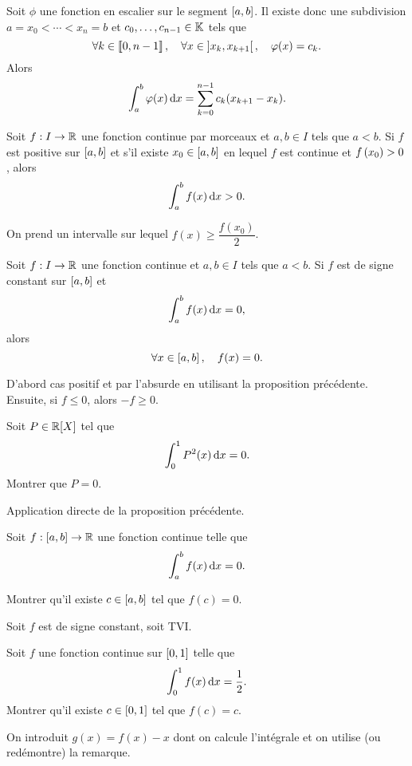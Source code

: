 \documentclass{magnolia}
\begin{document}
\begin{remarqueUnique}
\remarque[utile=-3] Soit $\phi$ une fonction en escalier sur le segment $\left[a,b\right]$. Il existe donc une subdivision $a=x_0<\cdots<x_n=b$ et $c_0,\ldots,c_{n-1}\in\mathbb{K}$ tels que
\[\forall k\in\left\llbracket 0,n-1\right\rrbracket,\quad \forall x\in\left]x_k,x_{k+1}\right[ ,\quad \varphi(x)=c_k.\]
Alors
\[\int_{a}^{b} \varphi(x)\,\text{d}x=\sum_{k=0}^{n-1} c_k(x_{k+1}-x_k).\]
\end{remarqueUnique}


\begin{proposition}[utile=2]
Soit $f:I\to\mathbb{R}$ une fonction continue par morceaux et $a, b\in I$ tels que $a< b$. Si $f$ est positive sur $\left[a,b\right]$ et s'il existe
$x_0\in\left[a,b\right]$ en lequel $f$ est continue et $f\left(x_0\right)>0$, alors
\[\int_{a}^{b} f(x)\,\text{d}x>0.\]
\end{proposition}

\begin{preuve}
On prend un intervalle sur lequel $f(x)\geq \dfrac{f(x_0)}{2}$.
\end{preuve}


\begin{proposition}[utile=2]
Soit $f:I\to\mathbb{R}$ une fonction continue et $a,b\in I$ tels que $a< b$. Si $f$ est de
signe constant sur $\left[a,b\right]$ et
\[\int_{a}^{b} f(x)\,\text{d}x=0,\]
alors
\[\forall x\in\left[a,b\right] ,\quad f(x)=0.\]
\end{proposition}

\begin{preuve}
D'abord cas positif et par l'absurde en utilisant la proposition précédente. Ensuite, si $f\leq 0$, alors $-f\geq 0$.
\end{preuve}

\begin{exos}
\exo[utile=3] Soit $P\in\polyR$ tel que
  \[\int_{0}^{1} P^2(x)\,\text{d}x=0.\]
  Montrer que $P=0$.
  \begin{sol}
  Application directe de la proposition précédente.
  \end{sol}
\exo Soit $f:[a,b]\to\mathbb{R}$ une fonction continue telle que
  \[\int_{a}^{b} f(x)\,\text{d}x=0.\]
  
  Montrer qu'il existe $c\in\left[a,b\right]$ tel que $f(c)=0$.
  \begin{sol}
  Soit $f$ est de signe constant, soit TVI.
  \end{sol}
\exo[utile=1] Soit $f$ une fonction continue sur $\left[0,1\right]$ telle que
  \[\int_{0}^{1} f(x)\,\text{d}x=\frac{1}{2}.\]
  Montrer qu'il existe $c\in\left[0,1\right]$ tel que $f(c)=c$.
  \begin{sol}
  On introduit $g(x)=f(x)-x$ dont on calcule l'intégrale et on utilise (ou redémontre) la remarque.
  \end{sol}
\end{exos}
\end{document}
